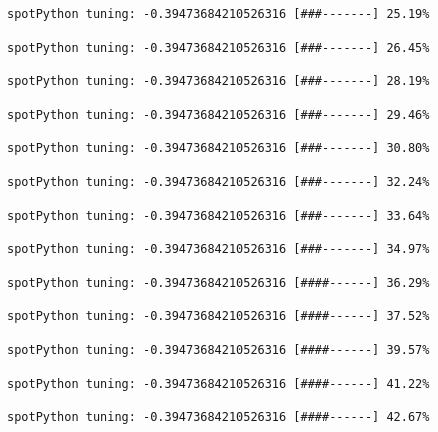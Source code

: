 \documentclass[
  letterpaper,
  DIV=11,
  numbers=noendperiod]{scrreprt}
\begin{document}
\begin{verbatim}
spotPython tuning: -0.39473684210526316 [###-------] 25.19% 
\end{verbatim}

\begin{verbatim}
spotPython tuning: -0.39473684210526316 [###-------] 26.45% 
\end{verbatim}

\begin{verbatim}
spotPython tuning: -0.39473684210526316 [###-------] 28.19% 
\end{verbatim}

\begin{verbatim}
spotPython tuning: -0.39473684210526316 [###-------] 29.46% 
\end{verbatim}

\begin{verbatim}
spotPython tuning: -0.39473684210526316 [###-------] 30.80% 
\end{verbatim}

\begin{verbatim}
spotPython tuning: -0.39473684210526316 [###-------] 32.24% 
\end{verbatim}

\begin{verbatim}
spotPython tuning: -0.39473684210526316 [###-------] 33.64% 
\end{verbatim}

\begin{verbatim}
spotPython tuning: -0.39473684210526316 [###-------] 34.97% 
\end{verbatim}

\begin{verbatim}
spotPython tuning: -0.39473684210526316 [####------] 36.29% 
\end{verbatim}

\begin{verbatim}
spotPython tuning: -0.39473684210526316 [####------] 37.52% 
\end{verbatim}

\begin{verbatim}
spotPython tuning: -0.39473684210526316 [####------] 39.57% 
\end{verbatim}

\begin{verbatim}
spotPython tuning: -0.39473684210526316 [####------] 41.22% 
\end{verbatim}

\begin{verbatim}
spotPython tuning: -0.39473684210526316 [####------] 42.67% 
\end{verbatim}
\end{document}

